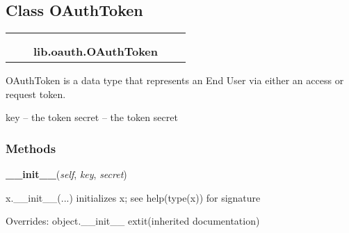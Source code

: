 

\subsection{Class OAuthToken}

    \label{lib:oauth:OAuthToken}
\begin{tabular}{cccccc}
\multicolumn{2}{r}{\settowidth{\BCL}{object}\multirow{2}{\BCL}{object}}
&&
  \\\cline{3-3}
  &&\multicolumn{1}{c|}{}
&&
  \\
&&\multicolumn{2}{l}{\textbf{lib.oauth.OAuthToken}}
\end{tabular}

OAuthToken is a data type that represents an End User via either an access 
or request token.

key -- the token secret -- the token secret



  \subsubsection{Methods}

    \vspace{0.5ex}

\hspace{.8\funcindent}\begin{boxedminipage}{\funcwidth}

    \raggedright \textbf{\_\_init\_\_}(\textit{self}, \textit{key}, \textit{secret})

\setlength{\parskip}{2ex}
    x.\_\_init\_\_(...) initializes x; see help(type(x)) for signature

\setlength{\parskip}{1ex}
      Overrides: object.\_\_init\_\_ 	extit{(inherited documentation)}

    \end{boxedminipage}

